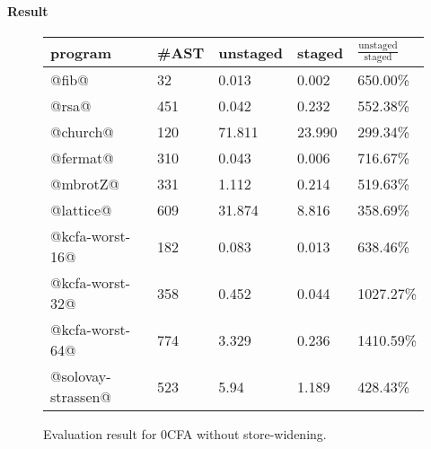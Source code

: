 \iffalse
We used the following benchmark programs:
\begin{itemize}
  \item \textbf{rsa}: The RSA public key encryption algorithm.
  \item \textbf{kcfa3}: A difficult benchmark for $k$-CFA.
  \item \textbf{church}: Church numerals with additions and mutiplications.
  \item \textbf{fermat}: Fermat and Solovay-Strassen primality testing.
  \item \textbf{kcfa-worst-case-}\textit{n}: 
    Benchmark programs that are supposed to be tough cases for $k$-CFA; 
    the number $n$ indicates the depth of nesting lambda terms.
\end{itemize}
\fi

\paragraph{Result}

\begin{figure}[h]
\footnotesize
\begin{tabular}{@{}lllll@{}}
\toprule
    program             &\#AST & unstaged   & staged     & $\frac{\text{unstaged}}{\text{staged}}$ \\ \midrule
    @fib@               & 32   & 0.013      & 0.002      & 650.00\%          \\
    @rsa@               & 451  & 0.042      & 0.232      & 552.38\%          \\
    @church@            & 120  & 71.811     & 23.990     & 299.34\%          \\
    @fermat@            & 310  & 0.043      & 0.006      & 716.67\%          \\
    @mbrotZ@            & 331  & 1.112      & 0.214      & 519.63\%          \\
    @lattice@           & 609  & 31.874     & 8.816      & 358.69\%          \\
    @kcfa-worst-16@     & 182  & 0.083      & 0.013      & 638.46\%          \\
    @kcfa-worst-32@     & 358  & 0.452      & 0.044      & 1027.27\%         \\
    @kcfa-worst-64@     & 774  & 3.329      & 0.236      & 1410.59\%         \\
    @solovay-strassen@  & 523  & 5.94       & 1.189      & 428.43\%          \\
    \bottomrule
\end{tabular}
\caption{Evaluation result for 0CFA without store-widening.} \label{evaluation_result}
\end{figure}


